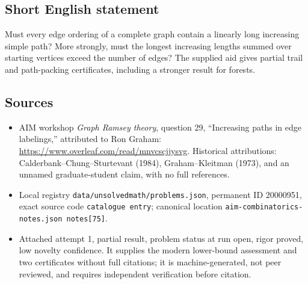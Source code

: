 \documentclass[11pt]{article}
\begin{document}
\subsection{Short English statement}
Must every edge ordering of a complete graph contain a linearly long increasing simple path? More strongly, must the longest increasing lengths summed over starting vertices exceed the number of edges? The supplied aid gives partial trail and path-packing certificates, including a stronger result for forests.
\subsection{Sources}
\begin{itemize}
\item AIM workshop \emph{Graph Ramsey theory}, question 29, ``Increasing paths in edge labelings,'' attributed to Ron Graham: \url{https://www.overleaf.com/read/mnvcscjjysvg}. Historical attributions: Calderbank--Chung--Sturtevant (1984), Graham--Kleitman (1973), and an unnamed graduate-student claim, with no full references.
\item Local registry \texttt{data/unsolvedmath/problems.json}, permanent ID 20000951, exact source code \texttt{catalogue entry}; canonical location \texttt{aim-combinatorics-notes.json notes[75]}.
\item Attached attempt 1, partial result, problem status at run open, rigor proved, low novelty confidence. It supplies the modern lower-bound assessment and two certificates without full citations; it is machine-generated, not peer reviewed, and requires independent verification before citation.
\end{itemize}
\end{document}
